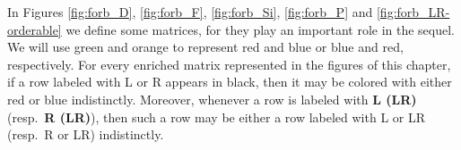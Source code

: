 \documentclass[12pt]{book}
\theoremstyle{plain}
\theoremstyle{remark}
\begin{document}
In Figures \ref{fig:forb_D}, \ref{fig:forb_F}, \ref{fig:forb_Si}, \ref{fig:forb_P} and \ref{fig:forb_LR-orderable} we define some matrices, for they play an important role in the sequel. 
We will use green and orange to represent red and blue or blue and red, respectively. For every enriched matrix represented in the figures of this chapter, if a row labeled with L or R appears in black, then it may be colored with either red or blue indistinctly.
Moreover, whenever a row is labeled with \textbf{L (LR)} (resp.\ \textbf{R (LR)}), then such a row may be either a row labeled with L or LR (resp.\ R or LR) indistinctly.


\begin{comment}
\begin{figure}[H]
	\centering
	\small{
	\begin{align*}	
		D_0 = \bordermatrix{ & \cr
		 \textbf L & 1 0\cr
		 \textbf L & 0 1 }
		&&	
		D_1 = \bordermatrix{ & \cr
	  \textbf L & 1 \cr
	  \textbf R & 1 }
	  \begin{matrix}
	  \textcolor{dark-green}{\bullet} \\ \textcolor{dark-green}{\bullet}
	  \end{matrix}
		&&		
	D_2  = \bordermatrix{ &  \cr
	 	 \textbf L  & 1 0 \cr
		 \textbf R  & 1 0 }
	 \begin{matrix}
	  \textcolor{dark-green}{\bullet} \\ \textcolor{dark-orange}{\bullet}
	  \end{matrix}
		 &&
		D_3 = \bordermatrix{ & \cr
	\textbf L & 1 0 0 \cr
	\textbf R & 0 0 1 \cr
	\textbf{LR} & 0 1 0 }
	\begin{matrix}
	  \textcolor{dark-green}{\bullet} \\ \textcolor{dark-orange}{\bullet} \\ \\
	  \end{matrix}
	\end{align*}
	\begin{align*}
		D_4 = \bordermatrix{ & \cr
	\textbf L & 1 \cr
	\textbf L & 1 \cr
	\textbf{LR} & 0 }
	\begin{matrix}
	  \textcolor{dark-green}{\bullet} \\ \textcolor{dark-orange}{\bullet} \\ \\
	  \end{matrix}
		&&
		D_5 = \bordermatrix{ & \cr
	\textbf L & 1 \cr
	\textbf R & 1 \cr
	\textbf{LR} & 1 }

\end{comment}
\end{document}
